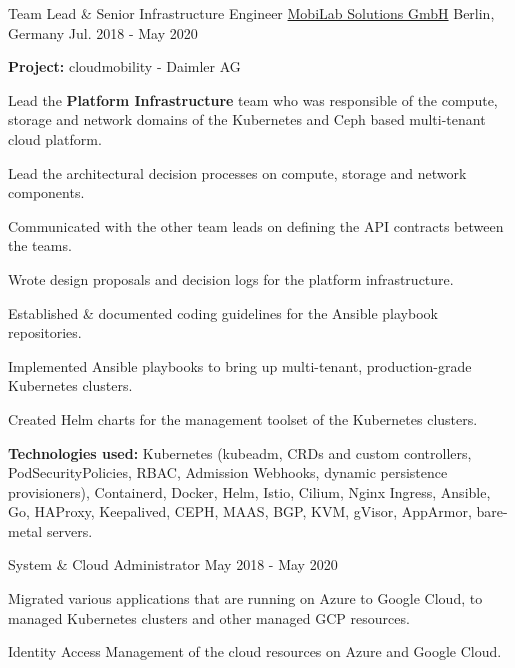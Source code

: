 \begin{cventries}
    \cventry
    {Team Lead \& Senior Infrastructure Engineer}
    {\href{https://mobilabsolutions.com/}{MobiLab Solutions GmbH}}
    {Berlin, Germany}
    {Jul. 2018 - May 2020}
    {
        \begin{cvitems}
            \item {\textbf{Project:} cloudmobility - Daimler AG}
            \newline
            \item {Lead the \textbf{Platform Infrastructure} team who was responsible of the compute,
                storage and network domains of the Kubernetes and Ceph based multi-tenant cloud platform.}
            \item {Lead the architectural decision processes on compute, storage and network components.}
            \item {Communicated with the other team leads on defining the API contracts between the teams.}
            \item {Wrote design proposals and decision logs for the platform infrastructure.}
            \item {Established \& documented coding guidelines for the Ansible playbook repositories.}
            \item {Implemented Ansible playbooks to bring up multi-tenant, production-grade Kubernetes clusters.}
            \item {Created Helm charts for the management toolset of the Kubernetes clusters.}
            \smallskip
            \item {
                \textbf{Technologies used:} Kubernetes (kubeadm, CRDs and custom controllers,
                PodSecurityPolicies, RBAC, Admission Webhooks, dynamic persistence provisioners),
                Containerd, Docker, Helm, Istio, Cilium, Nginx Ingress, Ansible, Go,
                HAProxy, Keepalived, CEPH, MAAS, BGP, KVM, gVisor, AppArmor, bare-metal servers.
            }
        \end{cvitems}
    }

    \cventry
    {System \& Cloud Administrator}
    {}
    {}
    {May 2018 - May 2020}
    {
        \begin{cvitems}
            \item {
                Migrated various applications that are running on Azure to Google Cloud,
                to managed Kubernetes clusters and other managed GCP resources.
            }
            \item {Identity Access Management of the cloud resources on Azure and Google Cloud.}
        \end{cvitems}
    }


\end{cventries}
